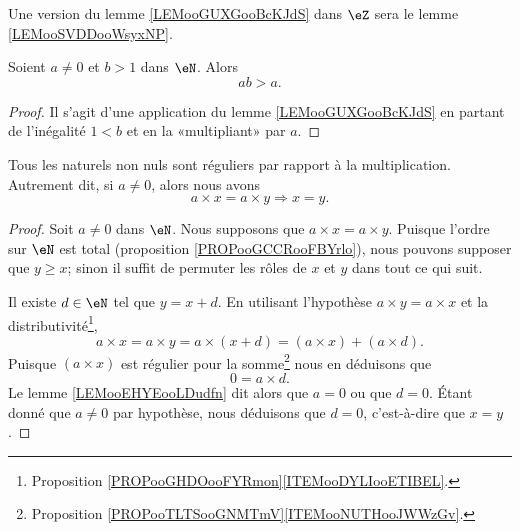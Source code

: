 \begin{remark}	\label{REMooultiplicationNaturelsOrdreStrictZ}
	Une version du lemme \ref{LEMooGUXGooBcKJdS} dans \( \eZ\) sera le lemme \ref{LEMooSVDDooWsyxNP}.
\end{remark}

\begin{lemma}        \label{LEMooSFUKooBNAple}
	Soient \( a\neq 0\) et \( b>1\) dans \( \eN\). Alors
	\begin{equation}
		ab>a.
	\end{equation}
\end{lemma}

\begin{proof}
	Il s'agit d'une application du lemme \ref{LEMooGUXGooBcKJdS} en partant de l'inégalité \( 1<b\) et en la «multipliant» par \( a\).
\end{proof}

\begin{proposition}		\label{PROPooNaturelsReguliersMultiplication}
	Tous les naturels non nuls sont réguliers par rapport à la multiplication. Autrement dit, si \( a\neq 0\), alors nous avons
	\begin{equation}
		a\times x=a\times y\Rightarrow x=y.
	\end{equation}
\end{proposition}

\begin{proof}
	Soit \( a\neq 0\) dans \( \eN\). Nous supposons que \( a\times x=a\times y\). Puisque l'ordre sur \( \eN\) est total (proposition \ref{PROPooGCCRooFBYrlo}), nous pouvons supposer que \( y\geq x\); sinon il suffit de permuter les rôles de \( x\) et \( y\) dans tout ce qui suit.

	Il existe \( d\in \eN\) tel que \( y=x+d\). En utilisant l'hypothèse \( a\times y=a\times x\) et la distributivité\footnote{Proposition \ref{PROPooGHDOooFYRmon}\ref{ITEMooDYLIooETIBEL}.},
	\begin{equation}
		a\times x=a\times y=a\times (x+d)=(a\times x)+(a\times d).
	\end{equation}
	Puisque \( (a\times x)\) est régulier pour la somme\footnote{Proposition \ref{PROPooTLTSooGNMTmV}\ref{ITEMooNUTHooJWWzGv}.} nous en déduisons que
	\begin{equation}
		0=a\times d.
	\end{equation}
	Le lemme \ref{LEMooEHYEooLDudfn} dit alors que \( a=0\) ou que \( d=0\). Étant donné que \( a\neq 0\) par hypothèse, nous déduisons que \( d=0\), c'est-à-dire que \( x=y\).
\end{proof}

